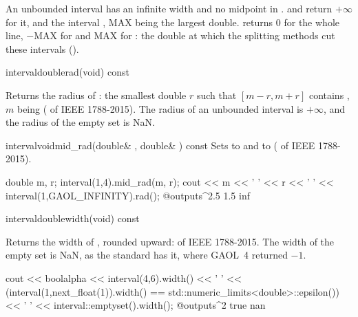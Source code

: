 \documentclass[12pt,a4paper,twoside,openright]{book}
\begin{document}
\begin{Rem}\label{rem:functions-unbounded}
An unbounded interval has an infinite width and no midpoint in \RSet.
 and  return $+\infty$ for it, and
 the interval , MAX being
the largest double.  returns $0$ for the whole line,
$-\text{MAX}$ for  and MAX for : the double
at which the splitting methods cut these intervals ().
\end{Rem}

\begin{defmethod}{interval}{double}{rad}{(void) const}
  \begin{operation}
  \end{operation}
  Returns the radius of : the smallest double $r$ such that
  $[m-r,m+r]$ contains , $m$ being 
  ( of IEEE 1788-2015). The radius of an unbounded interval is
  $+\infty$, and the radius of the empty set is NaN.\newinvfive
\end{defmethod}

\begin{defmethod}{interval}{void}{mid\_rad}{(double\& , double\& ) const}
  Sets  to  and  to 
  ( of IEEE 1788-2015).\newinvfive
\begin{example}
double m, r;
interval(1,4).mid_rad(m, r);
cout << m << ' ' << r << ' ' << interval(1,GAOL_INFINITY).rad();
@outputs^2.5 1.5 inf~
\end{example}
\end{defmethod}

\begin{defmethod}{interval}{double}{width}{(void) const}
  \begin{operation}
  \end{operation}
  Returns the width of , rounded upward:  of IEEE
  1788-2015. The width of the empty set is NaN, as the standard has it,
  where GAOL~4 returned $-1$.\newinvfive
\begin{example}
cout << boolalpha << interval(4,6).width() << ' '
     << (interval(1,next_float(1)).width()
         == std::numeric_limits<double>::epsilon()) << ' '
     << interval::emptyset().width();
@outputs^2 true nan~
\end{example}
\end{defmethod}
\end{document}
